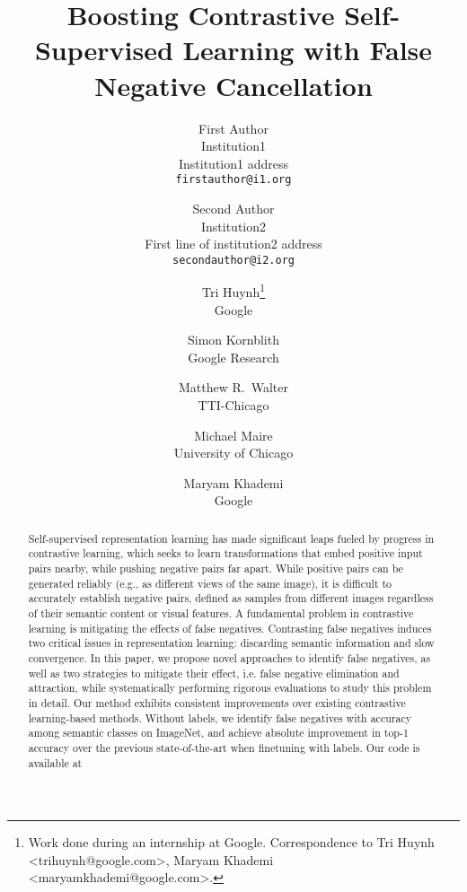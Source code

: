 \documentclass[10pt,twocolumn,letterpaper]{article}
\begin{document}
\title{Boosting Contrastive Self-Supervised Learning with False Negative Cancellation}

\author{First Author\\
Institution1\\
Institution1 address\\
{\tt\small firstauthor@i1.org}
\and
Second Author\\
Institution2\\
First line of institution2 address\\
{\tt\small secondauthor@i2.org}
}

\author{\normalsize Tri Huynh\thanks{Work done during an internship at Google. Correspondence to Tri Huynh <trihuynh@google.com>, Maryam Khademi <maryamkhademi@google.com>.} \\ \small Google \and \normalsize Simon Kornblith \\ \small Google Research \and \normalsize Matthew R.\ Walter \\ \small TTI-Chicago \and \normalsize Michael Maire \\ \small University of Chicago \and \normalsize Maryam Khademi \\ \small Google}

\maketitle

\ifwacvfinal
\thispagestyle{empty}
\fi

\begin{abstract}
Self-supervised representation learning has made significant leaps fueled by progress in contrastive learning, which seeks to learn transformations that embed positive input pairs nearby, while pushing negative pairs far apart. While positive pairs can be generated reliably (e.g., as different views of the same image), it is difficult to accurately establish negative pairs, defined as samples from different images regardless of their semantic content or visual features. A fundamental problem in contrastive learning is mitigating the effects of false negatives. Contrasting false negatives induces two critical issues in representation learning: discarding semantic information and slow convergence. In this paper, we propose novel approaches to identify false negatives, as well as two strategies to mitigate their effect, i.e. false negative elimination and attraction,
while systematically performing rigorous evaluations to study this problem in detail. Our method exhibits consistent improvements over existing contrastive learning-based methods. Without labels, we identify false negatives with  accuracy among  semantic classes on ImageNet, and achieve  absolute improvement in top-1 accuracy over the previous state-of-the-art when finetuning with  labels. Our code is available at \href{https://github.com/google-research/fnc}{\color{red}{https://github.com/google-research/fnc}}
\end{abstract}
 \vspace{-15pt}
\end{document}
